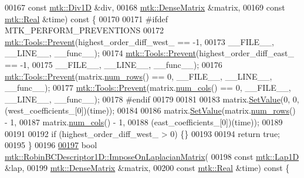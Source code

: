 \begin{DoxyCode}
00167     \textcolor{keyword}{const} \hyperlink{classmtk_1_1Div1D}{mtk::Div1D} &div,
00168     \hyperlink{classmtk_1_1DenseMatrix}{mtk::DenseMatrix} &matrix,
00169     \textcolor{keyword}{const} \hyperlink{group__c01-roots_gac080bbbf5cbb5502c9f00405f894857d}{mtk::Real} &time)\textcolor{keyword}{ const }\{
00170 
00171 \textcolor{preprocessor}{  #ifdef MTK\_PERFORM\_PREVENTIONS}
00172   \hyperlink{classmtk_1_1Tools_a332324c6f25e66be9dff48c5987a3b9f}{mtk::Tools::Prevent}(highest\_order\_diff\_west\_ == -1,
00173                       \_\_FILE\_\_, \_\_LINE\_\_, \_\_func\_\_);
00174   \hyperlink{classmtk_1_1Tools_a332324c6f25e66be9dff48c5987a3b9f}{mtk::Tools::Prevent}(highest\_order\_diff\_east\_ == -1,
00175                       \_\_FILE\_\_, \_\_LINE\_\_, \_\_func\_\_);
00176   \hyperlink{classmtk_1_1Tools_a332324c6f25e66be9dff48c5987a3b9f}{mtk::Tools::Prevent}(matrix.\hyperlink{classmtk_1_1DenseMatrix_a53f3afb3b6a8d21854458aaa9663cc74}{num\_rows}() == 0, \_\_FILE\_\_, \_\_LINE\_\_, \_\_func\_\_);
00177   \hyperlink{classmtk_1_1Tools_a332324c6f25e66be9dff48c5987a3b9f}{mtk::Tools::Prevent}(matrix.\hyperlink{classmtk_1_1DenseMatrix_a41747502d468c6728a4be31501b16e0e}{num\_cols}() == 0, \_\_FILE\_\_, \_\_LINE\_\_, \_\_func\_\_);
00178 \textcolor{preprocessor}{  #endif}
00179 
00181 
00183   matrix.\hyperlink{classmtk_1_1DenseMatrix_a784ce5784109ac86bfb9d8562b334b13}{SetValue}(0, 0, (west\_coefficients\_[0])(time));
00184 
00186   matrix.\hyperlink{classmtk_1_1DenseMatrix_a784ce5784109ac86bfb9d8562b334b13}{SetValue}(matrix.\hyperlink{classmtk_1_1DenseMatrix_a53f3afb3b6a8d21854458aaa9663cc74}{num\_rows}() - 1,
00187                   matrix.\hyperlink{classmtk_1_1DenseMatrix_a41747502d468c6728a4be31501b16e0e}{num\_cols}() - 1,
00188                   (east\_coefficients\_[0])(time));
00189 
00191 
00192   \textcolor{keywordflow}{if} (highest\_order\_diff\_west\_ > 0) \{\}
00193 
00194   \textcolor{keywordflow}{return} \textcolor{keyword}{true};
00195 \}
00196 
\hypertarget{mtk__robin__bc__descriptor__1d_8cc_source_l00197}{}\hyperlink{classmtk_1_1RobinBCDescriptor1D_ab8446428df923c27f388a85bd3f2c6d4}{00197} \textcolor{keywordtype}{bool} \hyperlink{classmtk_1_1RobinBCDescriptor1D_ab8446428df923c27f388a85bd3f2c6d4}{mtk::RobinBCDescriptor1D::ImposeOnLaplacianMatrix}(
00198     \textcolor{keyword}{const} \hyperlink{classmtk_1_1Lap1D}{mtk::Lap1D} &lap,
00199     \hyperlink{classmtk_1_1DenseMatrix}{mtk::DenseMatrix} &matrix,
00200     \textcolor{keyword}{const} \hyperlink{group__c01-roots_gac080bbbf5cbb5502c9f00405f894857d}{mtk::Real} &time)\textcolor{keyword}{ const }\{

\end{DoxyCode}
